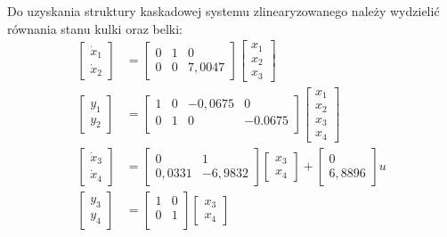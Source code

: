 Do uzyskania struktury kaskadowej systemu zlinearyzowanego należy wydzielić równania stanu kulki oraz belki:
\begin{align}
\begin{bmatrix}
\dot{x}_1 \\ \dot{x}_2
\end{bmatrix}
&= \begin{bmatrix}
    0 & 1 & 0 \\
    0 & 0 & 7,0047
\end{bmatrix}
\begin{bmatrix}
    x_1 \\ x_2 \\ x_3
\end{bmatrix} \label{eq:rownania_stanu_kulki} \\
\begin{bmatrix}
    y_1 \\ y_2
\end{bmatrix}
&= \begin{bmatrix}
    1 & 0 & -0,0675 & 0 \\
    0 & 1 & 0 & -0.0675 \\
\end{bmatrix}
\begin{bmatrix}
x_1 \\ x_2 \\ x_3 \\ x_4
\end{bmatrix} \label{eq:rownania_wyjscia_kulki} \\
\begin{bmatrix}
    \dot{x}_3 \\ \dot{x}_4
\end{bmatrix}
&= \begin{bmatrix}
    0 & 1 \\
    0,0331 & -6,9832
\end{bmatrix}
\begin{bmatrix}
    x_3 \\ x_4
\end{bmatrix}
+
\begin{bmatrix}
    0 \\ 6,8896
\end{bmatrix}
u \label{eq:rownania_stanu_belki} \\%
\begin{bmatrix}
    y_3 \\ y_4
\end{bmatrix}
&= \begin{bmatrix}
    1 & 0 \\
    0 & 1 \\
\end{bmatrix}
\begin{bmatrix}
    x_3 \\ x_4
\end{bmatrix} \label{eq:rownania_wyjscia_belki} 
\end{align}

